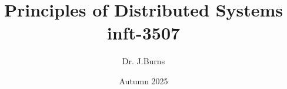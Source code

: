 \newcommand{\lstpath}[1]{}
\newcommand{\setlstpath}[1]{\renewcommand{\lstpath}{#1}}
\newcommand{\includelisting}[1]{}
\newcommand{\oper}[1]{\mbox{$\mathsf{#1}$}}

\newcommand{\lseq}{\mbox{[}}
\newcommand{\rseq}{\mbox{]}}
\newcommand{\sseq}{,\ }


\newcommand{\czero}{}
\newcommand{\ci}{Introduction}
\newcommand{\cii}{Architectures}
\newcommand{\ciii}{Processes}
\newcommand{\civ}{Communication}
\newcommand{\cv}{Coordination}
\newcommand{\cvi}{Naming}
\newcommand{\cvii}{Consistency and Replication}
\newcommand{\cviii}{Fault Tolerance}
\newcommand{\cix}{Security}

\newtheorem{algorithm}{Algorithm}


\title{\textbf{Principles of Distributed Systems} \\ {\small inft-3507}}
\author{Dr. J.Burns}
\date{Autumn 2025}



\graphicspath{{./\figdir\chap/}} %
\setlstpath{./\figdir\chap/}     %

